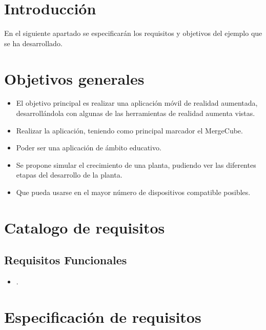 
\section{Introducción}
En el siguiente apartado se especificarán los requisitos y objetivos del ejemplo que se ha desarrollado.
\section{Objetivos generales}
 \begin{itemize}
	\item El objetivo principal es realizar una aplicación móvil de realidad aumentada, desarrollándola con algunas de las herramientas de realidad aumenta vistas.
	\item Realizar la aplicación, teniendo como principal marcador el MergeCube.
	\item Poder ser una aplicación de ámbito educativo.
	\item Se propone simular el crecimiento de una planta, pudiendo ver las diferentes etapas del desarrollo de la planta.
	\item Que pueda usarse en el mayor número de dispositivos compatible posibles.  
\end{itemize}
\section{Catalogo de requisitos}
\subsection{Requisitos Funcionales}
 \begin{itemize}
	\item . 
\end{itemize}
\section{Especificación de requisitos}


